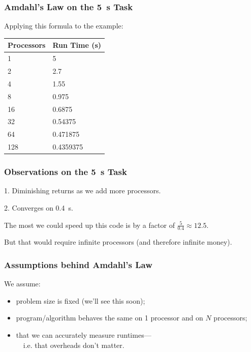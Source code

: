 \begin{frame}
\frametitle{Amdahl's Law on the 5~s Task}

Applying this formula to the example:

\begin{center}
	\begin{tabular}{l|l}
	\textbf{Processors} & \textbf{Run Time (s)} \\ \hline
	1 & 5\\
	2 & 2.7\\
	4 & 1.55\\
	8 & 0.975\\
	16 & 0.6875 \\
	32 & 0.54375 \\
	64 & 0.471875 \\
	128 & 0.4359375\\
	\end{tabular}
\end{center}

\end{frame}

 
\begin{frame}
\frametitle{Observations on the 5~s Task}

1. Diminishing returns as we add more processors.

2. Converges on 0.4~s.

The most we could speed up this code is by a factor of $\frac{5}{0.4}\approx 12.5$.

But that would require infinite processors (and therefore infinite money).

\end{frame}

\begin{frame}
  \frametitle{Assumptions behind Amdahl's Law}

    We assume:
    \begin{itemize}
    \item problem size is fixed (we'll see this soon);
    \item program/algorithm behaves the same on 1 processor and on $N$ processors;
    \item that we can accurately measure runtimes---\\ ~~i.e. that overheads don't matter.
    \end{itemize}
  
\end{frame}

